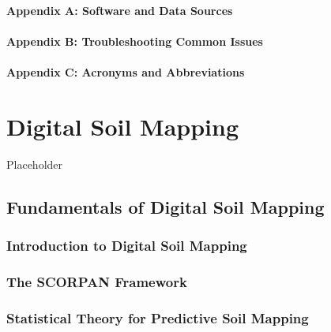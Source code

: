 \documentclass[
  10pt,
  b5paper,
  oneside]{book}
\begin{document}
\subsubsection*{Appendix A: Software and Data Sources}\label{appendix-a-software-and-data-sources}

\subsubsection*{Appendix B: Troubleshooting Common Issues}\label{appendix-b-troubleshooting-common-issues}

\subsubsection*{Appendix C: Acronyms and Abbreviations}\label{appendix-c-acronyms-and-abbreviations}

\chapter{Digital Soil Mapping}\label{digital-soil-mapping}

Placeholder

\section{Fundamentals of Digital Soil Mapping}\label{fundamentals-of-digital-soil-mapping}

\subsection{Introduction to Digital Soil Mapping}\label{introduction-to-digital-soil-mapping}

\subsection*{The SCORPAN Framework}\label{SCORPAN-Framework}

\subsection{Statistical Theory for Predictive Soil Mapping}\label{statistical-theory-for-predictive-soil-mapping}
\end{document}
